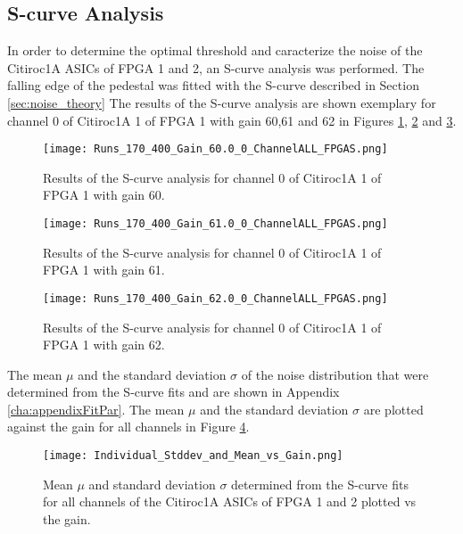 \subsection{S-curve Analysis}
In order to determine the optimal threshold and caracterize the noise of the Citiroc1A ASICs of FPGA 1 and 2, an S-curve analysis was performed.
\newline
The falling edge of the pedestal was fitted with the S-curve described in Section \ref{sec:noise_theory}
\newline
The results of the S-curve analysis are shown exemplary for channel 0 of Citiroc1A 1 of FPGA 1 with gain 60,61 and 62 in Figures \ref{fig:S_curve_60}, \ref{fig:S_curve_61} and \ref{fig:S_curve_62}.

\begin{figure}[H]
    \centering
    \texttt{[image: Runs\_170\_400\_Gain\_60.0\_0\_ChannelALL\_FPGAS.png]}
    \caption{Results of the S-curve analysis for channel 0 of Citiroc1A 1 of FPGA 1 with gain 60.}
    \label{fig:S_curve_60}
\end{figure}
\begin{figure}[H]
    \centering
    \texttt{[image: Runs\_170\_400\_Gain\_61.0\_0\_ChannelALL\_FPGAS.png]}
    \caption{Results of the S-curve analysis for channel 0 of Citiroc1A 1 of FPGA 1 with gain 61.}
    \label{fig:S_curve_61}
\end{figure}
\begin{figure}[H]
    \centering
    \texttt{[image: Runs\_170\_400\_Gain\_62.0\_0\_ChannelALL\_FPGAS.png]}
    \caption{Results of the S-curve analysis for channel 0 of Citiroc1A 1 of FPGA 1 with gain 62.}
    \label{fig:S_curve_62}
\end{figure}
The mean $\mu$ and the standard deviation $\sigma$ of the noise distribution that were determined from the S-curve fits and are shown in Appendix \ref{cha:appendixFitPar}.
The mean $\mu$ and the standard deviation $\sigma$ are plotted against the gain for all channels in Figure \ref{fig:Mean vs gain}.
\begin{figure}[H]
    \centering
    \texttt{[image: Individual\_Stddev\_and\_Mean\_vs\_Gain.png]}
    \caption{Mean $\mu$ and standard deviation $\sigma$ determined from the S-curve fits for all channels of the Citiroc1A ASICs of FPGA 1 and 2 plotted vs the gain.}
    \label{fig:Mean vs gain}
\end{figure}

